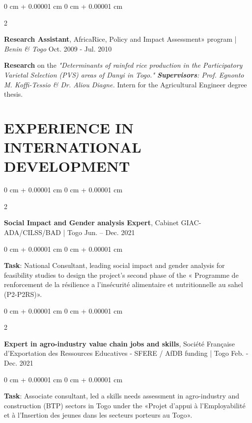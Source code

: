 \documentclass[10 pt, letterpaper]{article}
\newenvironment{onecolentry}{
    \begin{adjustwidth}{
        0 cm + 0.00001 cm
    }{
        0 cm + 0.00001 cm
    }
}{
    \end{adjustwidth}
} %
\newenvironment{twocolentry}[2][]{
    \onecolentry
    \def\secondColumn{#2}
    \setcolumnwidth{\fill, 4.5 cm}
    \begin{paracol}{2}
}{
    \switchcolumn \raggedleft \secondColumn
    \end{paracol}
    \endonecolentry
} %
\begin{document}
        \vspace{0.3 cm}

        \begin{twocolentry}{
            Oct. 2009 - Jul. 2010
        }
            \textbf{Research Assistant}, AfricaRice, Policy and Impact Assessment» program | \textit{Benin \& Togo} \end{twocolentry}
            \vspace{0.10 cm}
            \textbf{Research} on the \textit{"Determinants of rainfed rice production in the Participatory Varietal Selection (PVS) areas of Danyi in Togo." \textbf{Supervisors}: Prof. Egnonto M. Koffi-Tessio \& Dr. Aliou Diagne.} Intern for the Agricultural Engineer degree thesis.

        \vspace{0.15 cm}

    \section{EXPERIENCE IN INTERNATIONAL DEVELOPMENT}

        \begin{twocolentry}{
            Jun. – Dec. 2021
        }
            \textbf{Social Impact and Gender analysis Expert}, Cabinet GIAC-ADA/CILSS/BAD | Togo\end{twocolentry}

        \vspace{0.10 cm}
        \begin{onecolentry}
            \textbf{Task}: National Consultant, leading social impact and gender analysis for feasibility studies to design the project’s second phase of the « Programme de renforcement de la résilience a l’insécurité alimentaire et nutritionnelle au sahel (P2-P2RS)».
        \end{onecolentry}

        \vspace{0.20 cm}

        \begin{twocolentry}{
            Feb. - Dec. 2021
        }
            \textbf{Expert in agro-industry value chain jobs and skills}, Société Française d'Exportation des Ressources Educatives - SFERE / AfDB funding | Togo \end{twocolentry}

        \vspace{0.10 cm}
        \begin{onecolentry}
            \textbf{Task}: Associate consultant, led a skills needs assessment in agro-industry and construction (BTP) sectors in Togo under the «Projet d’appui à l’Employabilité et à l’Insertion des jeunes dans les secteurs porteurs au Togo».
        \end{onecolentry}
\end{document}
